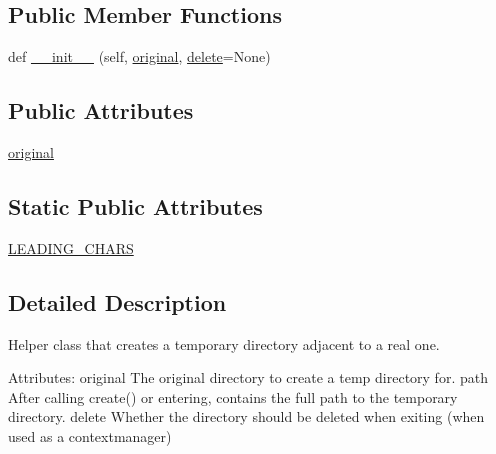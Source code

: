 \subsection*{Public Member Functions}
\begin{DoxyCompactItemize}
\item 
def \hyperlink{classpip_1_1__internal_1_1utils_1_1temp__dir_1_1AdjacentTempDirectory_aa9aeb5704a6b3e0aeb75895eb99ee6ca}{\+\_\+\+\_\+init\+\_\+\+\_\+} (self, \hyperlink{classpip_1_1__internal_1_1utils_1_1temp__dir_1_1AdjacentTempDirectory_afec831e8f80d0162660d0e8a8509080f}{original}, \hyperlink{classpip_1_1__internal_1_1utils_1_1temp__dir_1_1TempDirectory_a951c8f73bc5a1641a0114be38296e19a}{delete}=None)
\end{DoxyCompactItemize}
\subsection*{Public Attributes}
\begin{DoxyCompactItemize}
\item 
\hyperlink{classpip_1_1__internal_1_1utils_1_1temp__dir_1_1AdjacentTempDirectory_afec831e8f80d0162660d0e8a8509080f}{original}
\end{DoxyCompactItemize}
\subsection*{Static Public Attributes}
\begin{DoxyCompactItemize}
\item 
\hyperlink{classpip_1_1__internal_1_1utils_1_1temp__dir_1_1AdjacentTempDirectory_a7e8d25f15903fb8d220465e1f7b2f137}{L\+E\+A\+D\+I\+N\+G\+\_\+\+C\+H\+A\+RS}
\end{DoxyCompactItemize}


\subsection{Detailed Description}
\begin{DoxyVerb}Helper class that creates a temporary directory adjacent to a real one.

Attributes:
    original
        The original directory to create a temp directory for.
    path
        After calling create() or entering, contains the full
        path to the temporary directory.
    delete
        Whether the directory should be deleted when exiting
        (when used as a contextmanager)\end{DoxyVerb}
 

